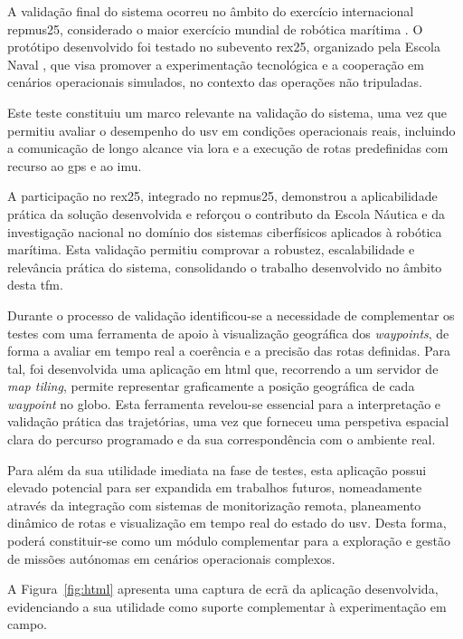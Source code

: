 A validação final do sistema ocorreu no âmbito do exercício internacional \gls{repmus25}, considerado o maior exercício mundial de robótica marítima \cite{iddportugal-repmus, sapo-repmus}. O protótipo desenvolvido foi testado no subevento \gls{rex25}, organizado pela Escola Naval \cite{escolanaval-repmus}, que visa promover a experimentação tecnológica e a cooperação em cenários operacionais simulados, no contexto das operações não tripuladas.  

Este teste constituiu um marco relevante na validação do sistema, uma vez que permitiu avaliar o desempenho do \gls{usv} em condições operacionais reais, incluindo a comunicação de longo alcance via \gls{lora} e a execução de rotas predefinidas com recurso ao \gls{gps} e ao \gls{imu}.  

A participação no \gls{rex25}, integrado no \gls{repmus25}, demonstrou a aplicabilidade prática da solução desenvolvida e reforçou o contributo da Escola Náutica e da investigação nacional no domínio dos sistemas ciberfísicos aplicados à robótica marítima. Esta validação permitiu comprovar a robustez, escalabilidade e relevância prática do sistema, consolidando o trabalho desenvolvido no âmbito desta \gls{tfm}.

Durante o processo de validação identificou-se a necessidade de complementar os testes com uma ferramenta de apoio à visualização geográfica dos \emph{waypoints}, de forma a avaliar em tempo real a coerência e a precisão das rotas definidas. Para tal, foi desenvolvida uma aplicação em \gls{html} que, recorrendo a um servidor de \emph{map tiling}, permite representar graficamente a posição geográfica de cada \emph{waypoint} no globo. Esta ferramenta revelou-se essencial para a interpretação e validação prática das trajetórias, uma vez que forneceu uma perspetiva espacial clara do percurso programado e da sua correspondência com o ambiente real.  

Para além da sua utilidade imediata na fase de testes, esta aplicação possui elevado potencial para ser expandida em trabalhos futuros, nomeadamente através da integração com sistemas de monitorização remota, planeamento dinâmico de rotas e visualização em tempo real do estado do \gls{usv}. Desta forma, poderá constituir-se como um módulo complementar para a exploração e gestão de missões autónomas em cenários operacionais complexos.  

A Figura~\ref{fig:html} apresenta uma captura de ecrã da aplicação desenvolvida, evidenciando a sua utilidade como suporte complementar à experimentação em campo.


